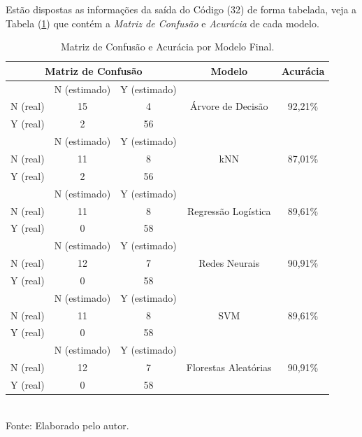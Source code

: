 \documentclass[a4paper,12pt]{article} %
\begin{document}
Estão dispostas as informações da saída do Código (32) de forma tabelada, veja a Tabela (\ref{tab:5}) que contém a \textit{Matriz de Confusão} e \textit{Acurácia} de cada modelo.
\begin{table}[H]
    \centering
    \caption{Matriz de Confusão e Acurácia por Modelo Final.} 
    \begin{tabular}{ccc|c|c} \\ \hline
         \multicolumn{3}{c|}{Matriz de Confusão} & Modelo & Acurácia \\\hline
         & N (estimado) & Y (estimado) & \multirow{3}{*}{Árvore de Decisão} & \multirow{3}{*}{92,21\%} \\
         N (real) & 15 & 4 &  & \\
         Y (real) & 2 & 56 &  & \\ \hline
         & N (estimado) & Y (estimado) & \multirow{3}{*}{kNN} & \multirow{3}{*}{87,01\%}\\
         N (real) & 11 & 8 &  & \\
         Y (real) & 2 & 56 &  & \\ \hline
         & N (estimado) & Y (estimado) & \multirow{3}{*}{Regressão Logística} & \multirow{3}{*}{89,61\%}\\
         N (real) & 11 & 8 &  & \\
         Y (real) & 0 & 58 &  & \\  \hline
         & N (estimado) & Y (estimado) & \multirow{3}{*}{Redes Neurais} & \multirow{3}{*}{90,91\%}\\
         N (real) & 12 & 7 &  & \\
         Y (real) & 0 & 58 &  & \\ \hline
         & N (estimado) & Y (estimado) & \multirow{3}{*}{SVM} & \multirow{3}{*}{89,61\%}\\
         N (real) & 11 & 8 &  & \\
         Y (real) & 0 & 58 &  & \\ \hline
         & N (estimado) & Y (estimado) & \multirow{3}{*}{Florestas Aleatórias} & \multirow{3}{*}{90,91\%}\\
         N (real) & 12 & 7 &  & \\
         Y (real) & 0 & 58 &  & \\ \hline\hline
    \end{tabular} \\
    \label{tab:5}
    Fonte: Elaborado pelo autor.
\end{table}
\end{document}
